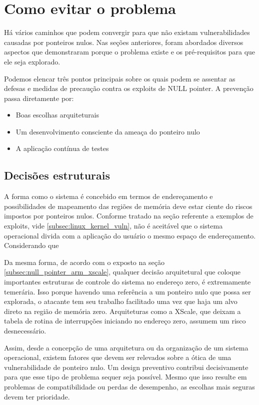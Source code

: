 						

	\section{Como evitar o problema}
		Há vários caminhos que podem convergir para que não existam vulnerabilidades causadas 
		por ponteiros nulos. Nas seções anteriores, foram abordados diversos aspectos que
		demonstraram porque o problema existe e os pré-requisitos para que ele seja explorado.
		

		Podemos elencar três pontos principais sobre os quais podem se assentar as defesas
		e medidas de precaução contra os exploits de NULL pointer.
		A prevenção passa diretamente por:
		\begin{itemize}
			\item{Boas escolhas arquiteturais}
			\item{Um desenvolvimento consciente da ameaça do ponteiro nulo}
			\item{A aplicação contínua de testes}
		\end{itemize}
	
		\subsection{Decisões estruturais}		
			A forma como o sistema é concebido em termos de endereçamento e possibilidades de mapeamento
			das regiões de memória deve estar ciente do riscos impostos por ponteiros nulos.
			Conforme tratado na seção referente a exemplos de exploits, vide \ref{subsec:linux_kernel_vuln},
			não é aceitável que o sistema operacional divida com a aplicação do usuário o mesmo espaço
			de endereçamento. Considerando que

			
			Da mesma forma, de acordo com o exposto na seção \ref{subsec:null_pointer_arm_xscale}, 
			qualquer decisão arquitetural que coloque importantes estruturas de controle do sistema no 
			endereço zero, é extremamente temerária.
			Isso porque havendo uma referência a um ponteiro nulo que possa ser explorada, o atacante
			tem seu trabalho facilitado uma vez que haja um alvo direto na região de memória zero.
			Arquiteturas como a XScale, que deixam a tabela de rotina de interrupções iniciando no endereço zero,
			assumem um risco desnecessário.


			Assim, desde a concepção de uma arquitetura ou da organização de um sistema operacional,
			existem fatores que devem ser relevados sobre a ótica de uma vulnerabilidade de ponteiro nulo.
			Um design preventivo contribui decisivamente para que esse tipo de problema sequer seja possível.
			Mesmo que isso resulte em problemas de compatibilidade ou perdas de desempenho, as escolhas
			mais seguras devem ter prioridade.

